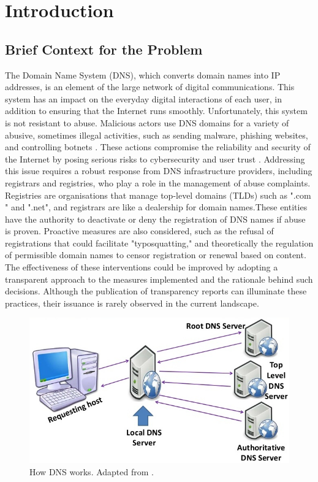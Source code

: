 \chapter{Introduction}


\section{Brief Context for the Problem}

The Domain Name System (DNS), which converts domain names into IP addresses, is an element of the large network of digital communications. This system has an impact on the everyday digital interactions of each user, in addition to ensuring that the Internet runs smoothly. Unfortunately, this system is not resistant to abuse. Malicious actors use DNS domains for a variety of abusive, sometimes illegal activities, such as sending malware, phishing websites, and controlling botnets \cite{so2022}. These actions compromise the reliability and security of the Internet by posing serious risks to cybersecurity and user trust \cite{bayer2022}. Addressing this issue requires a robust response from DNS infrastructure providers, including registrars and registries, who play a role in the management of abuse complaints. Registries are organisations that manage top-level domains (TLDs) such as ".com " and ".net", and registrars are like a dealership for domain names.These entities have the authority to deactivate or deny the registration of DNS names if abuse is proven. Proactive measures are also considered, such as the refusal of registrations that could facilitate "typosquatting," and theoretically the regulation of permissible domain names to censor registration or renewal based on content. The effectiveness of these interventions could be improved by adopting a transparent approach to the measures implemented and the rationale behind such decisions. Although the publication of transparency reports can illuminate these practices, their issuance is rarely observed in the current landscape.

\begin{figure}[H]
    \centering
    \includegraphics[width=0.5\linewidth]{introduction/dnsWork.jpg}
    \caption{How DNS works. Adapted from \cite{blanche2018understandingDNS}. }
    \label{fig:dnsIntro}
\end{figure}

